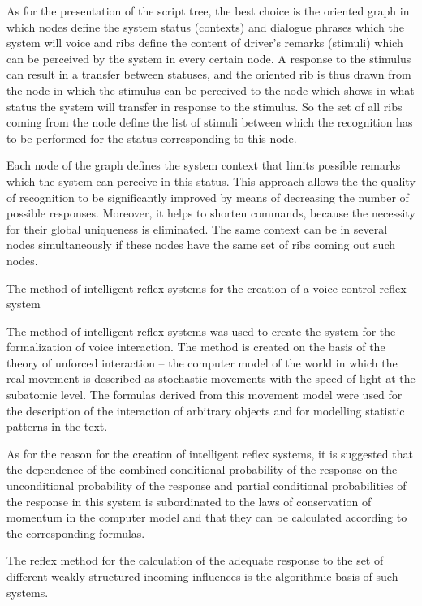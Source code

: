 As for the presentation of the script tree, the best choice is the oriented graph in which nodes define the system status (contexts) and dialogue phrases which the system will voice and ribs define the content of driver’s remarks (stimuli) which can be perceived by the system in every certain node. A response to the stimulus can result in a transfer between statuses, and the oriented rib is thus drawn from the node in which the stimulus can be perceived to the node which shows in what status the system will transfer in response to the stimulus. So the set of all ribs coming from the node define the list of stimuli between which the recognition has to be performed for the status corresponding to this node. 

Each node of the graph defines the system context that limits possible remarks which the system can perceive in this status. This approach allows the the quality of recognition to be significantly improved by means of decreasing the number of possible responses. Moreover, it helps to shorten commands, because the necessity for their global uniqueness is eliminated. The same context can be in several nodes simultaneously if these nodes have the same set of ribs coming out such nodes. 

The method of intelligent reflex systems for the creation of a voice control reflex system 

The method of intelligent reflex systems was used to create the system for the formalization of voice interaction. The method is created on the basis of the theory of unforced interaction – the computer model of the world in which the real movement is described as stochastic movements with the speed of light at the subatomic level. The formulas derived from this movement model were used for the description of the interaction of arbitrary objects and for modelling statistic patterns in the text. 

As for the reason for the creation of intelligent reflex systems, it is suggested that the dependence of the combined conditional probability of the response on the unconditional probability of the response and partial conditional probabilities of the response in this system is subordinated to the laws of conservation of momentum in the computer model and that they can be calculated according to the corresponding formulas. 

The reflex method for the calculation of the adequate response to the set of different weakly structured incoming influences is the algorithmic basis of such systems. 

